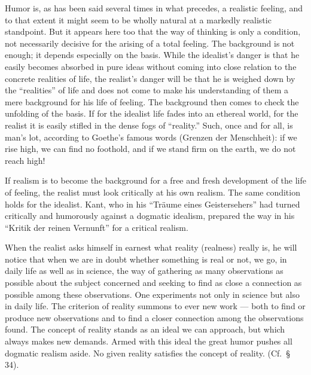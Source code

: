 \documentclass[12pt]{book}
\newcommand{\opage}[1]{\marginnote{\footnotesize\textit{[#1]}}}
\begin{document}
Humor is, as has been said several times in what precedes, a realistic feeling, and to that extent
it might seem to be wholly \opage{171}natural at a markedly realistic standpoint. But it appears
here too that the way of thinking is only a condition, not necessarily decisive for the arising of
a total feeling. The background is not enough; it depends especially on the basis. While the
idealist's danger is that he easily becomes absorbed in pure ideas without coming into close
relation to the concrete realities of life, the realist's danger will be that he is weighed down by
the ``realities'' of life and does not come to make his understanding of them a mere background for
his life of feeling. The background then comes to check the unfolding of the basis. If for the
idealist life fades into an ethereal world, for the realist it is easily stifled in the dense fogs of
``reality.'' Such, once and for all, is man's lot, according to Goethe's famous words (Grenzen der
Menschheit): if we rise high, we can find no foothold, and if we stand firm on the earth, we do not
reach high!

If realism is to become the background for a free and fresh development of the life of feeling, the
realist must look critically at his own realism. The same condition holds for the idealist. Kant, who
in his ``Träume eines Geistersehers'' had turned critically and humorously against a dogmatic
idealism, prepared the way in his ``Kritik der reinen Vernunft'' for a critical realism.

When the realist asks himself in earnest what reality (realness) really is, he will notice that when
we are in doubt whether something is real or not, we go, in daily life as well as in science, the
way of gathering as many observations as possible about the subject concerned and seeking to find as
close a connection as possible among these observations. One experiments not only in science but
also in daily life. The criterion of reality summons to ever new work --- both to find or produce new
observations and to find a closer connection among the observations found. The concept of reality
stands as an ideal we can approach, but which always makes new demands. Armed with this ideal the
great humor pushes all dogmatic realism aside. No given reality satisfies the concept of reality.
(Cf.\ § 34).
\end{document}
